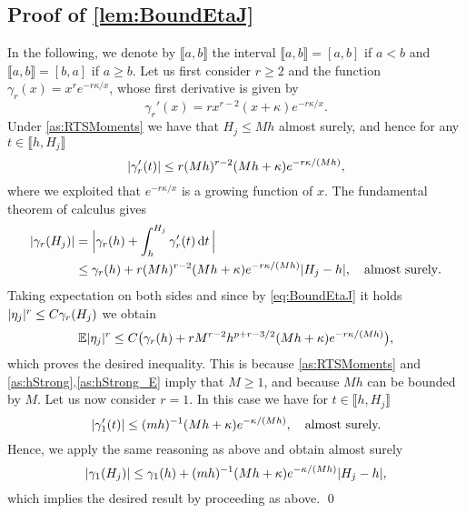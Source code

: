 \documentclass[10pt]{article}
\begin{document}
\subsection*{Proof of \cref{lem:BoundEtaJ}}
In the following, we denote by $\llbracket a, b \rrbracket$ the interval $\llbracket a, b \rrbracket = [a, b]$ if $a < b$ and $\llbracket a, b \rrbracket = [b, a]$ if $a \geq b$. Let us first consider $r \geq 2$ and the function $\gamma_r(x) = x^r e^{-r\kappa/x}$, whose first derivative is given by
	\begin{equation}
	\gamma_r'(x) = rx^{r-2}(x + \kappa) e^{-r\kappa/x}.
	\end{equation}
	Under \cref{as:RTSMoments} we have that $H_j \leq Mh$ almost surely, and hence for any $t \in \llbracket h, H_j\rrbracket$
	\begin{equation}
	\lvert\gamma_r'(t)\rvert \leq r (Mh)^{r-2} (Mh + \kappa)e^{-r\kappa/(Mh)},
	\end{equation}
	{where we exploited that $e^{-r\kappa/x}$ is a growing function of $x$.} The fundamental theorem of calculus gives
	\begin{equation}
	\begin{aligned}
	\lvert\gamma_r(H_j)\rvert &= \Big\lvert \gamma_r(h) + \int_{h}^{H_j} \gamma_r'(t) \,\mathrm{d} t \,\Big\rvert\\
	&\leq \gamma_r(h) + r (Mh)^{r-2} (Mh + \kappa)e^{-r\kappa/(Mh)} \lvert H_j - h\rvert, \quad \text{almost surely}.
	\end{aligned}
	\end{equation}
	Taking expectation on both sides and {since by \eqref{eq:BoundEtaJ} it holds} $\lvert\eta_j\rvert^r \leq C\gamma_r(H_j)$ we obtain
	\begin{equation}
	\operatorname{\mathbb{E}}\lvert\eta_j\rvert^r \leq C\big(\gamma_r(h) + r M^{r-2} h^{p+r-3/2} (Mh + \kappa)e^{-r\kappa/(Mh)}\big),
	\end{equation} 
	which proves the desired inequality. This is because \cref{as:RTSMoments} {and \cref{as:hStrong}.\ref{as:hStrong_E} imply} that $M \geq 1$, and because $Mh$ can be bounded by {$M$}. Let us now consider $r = 1$. In this case we have for $t \in \llbracket h, H_j\rrbracket$
	\begin{equation}
	\lvert\gamma_1'(t)\rvert \leq (mh)^{-1} (Mh + \kappa)e^{-\kappa/(Mh)}, \quad \text{almost surely.}
	\end{equation}
	Hence, we apply the same reasoning as above and obtain almost surely
	\begin{equation}
	\lvert\gamma_1(H_j)\rvert \leq \gamma_1(h) + (mh)^{-1} (Mh + \kappa) e^{-\kappa/(Mh)} \lvert H_j - h\rvert,
	\end{equation}
	which implies the desired result by proceeding as above.  \qed
\end{document}
